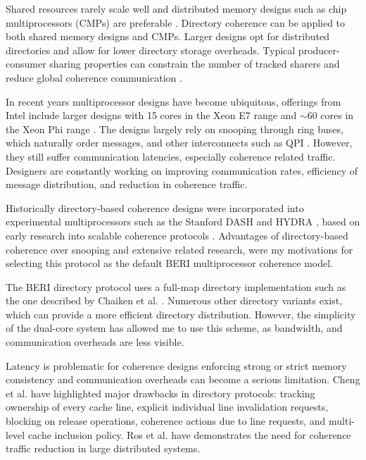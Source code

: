 		Shared resources rarely scale well and distributed memory designs such as chip multiprocessors (CMPs) are preferable \cite{Mullins04,Dally01}. Directory coherence can be applied to both shared memory designs and CMPs. Larger designs opt for distributed directories and allow for lower directory storage overheads. Typical producer-consumer sharing properties can constrain the number of tracked sharers and reduce global coherence communication \cite{Byrd99}.
		
		In recent years multiprocessor designs have become ubiquitous, offerings from Intel include larger designs with 15 cores in the Xeon E7 range \cite{xeon11} and $\sim$60 cores in the Xeon Phi range \cite{Rahman13}. The designs largely rely on snooping through ring buses, which naturally order messages, and other interconnects such as QPI \cite{Ziakas10}. 
		However, they still suffer communication latencies, especially coherence related traffic. Designers are constantly working on improving communication rates, efficiency of message distribution, and reduction in coherence traffic. 
		
		Historically directory-based coherence designs were incorporated into experimental multiprocessors such as the Stanford DASH and HYDRA \cite{Lenoski92,Hammond00}, based on early research into scalable coherence protocols \cite{Chaiken90,Agarwal88,Stenstrom90,Lilja93}. 
		Advantages of directory-based coherence over snooping and extensive related research, were my motivations for selecting this protocol as the default BERI multiprocessor coherence model.
		
		The BERI directory protocol uses a full-map directory implementation such as the one described by Chaiken et al. \cite{Chaiken90}. Numerous other directory variants exist, which can provide a more efficient directory distribution. However, the simplicity of the dual-core system has allowed me to use this scheme, as bandwidth, and communication overheads are less visible.
		
		Latency is problematic for coherence designs enforcing strong or strict memory consistency and communication overheads can become a serious limitation. Cheng et al. \cite{Cheng94} have highlighted major drawbacks in directory protocols: tracking ownership of every cache line, explicit individual line invalidation requests, blocking on release operations, coherence actions due to line requests, and multi-level cache inclusion policy. Ros et al. \cite{Ros12} have demonstrates the need for coherence traffic reduction in large distributed systems.
	
